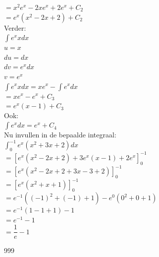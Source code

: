 \documentclass[a4paper]{article}
\begin{document}
$ = x^2e^x - 2xe^x + 2e^x + C_2 $ \\

$ = e^x(x^2 - 2x + 2) + C_2 $ \\

Verder: \\

$ \displaystyle\int e^x x dx $ \\

$ u = x $ \\

$ du = dx $ \\

$ dv = e^x dx $ \\

$ v = e^x $ \\

$ \displaystyle\int e^x x dx = xe^x - \displaystyle\int e^x dx $ \\

$ = xe^x - e^x + C_3 $ \\

$ = e^x(x-1) + C_3 $ \\

Ook: \\

$ \displaystyle\int e^x dx = e^x + C_4 $ \\

Nu invullen in de bepaalde integraal: \\

$ \displaystyle\int_{0}^{-1} e^x(x^2+3x+2) dx $ \\

$ = \left[ e^x(x^2 - 2x + 2) + 3e^x(x-1) + 2e^x \right]_{0}^{-1} $ \\

$ = \left[ e^x(x^2 - 2x + 2 + 3x - 3 + 2) \right]_{0}^{-1} $ \\

$ = \left[ e^x(x^2+x+1) \right]_{0}^{-1} $ \\

$ = e^{-1}((-1)^2+(-1)+1) - e^0(0^2+0+1) $ \\

$ = e^{-1}(1-1+1) - 1 $ \\

$ = e^{-1} - 1 $ \\

$ = \dfrac{1}{e} - 1 $ \\

\begin{thebibliography}{999}
\end{thebibliography}
\end{document}
